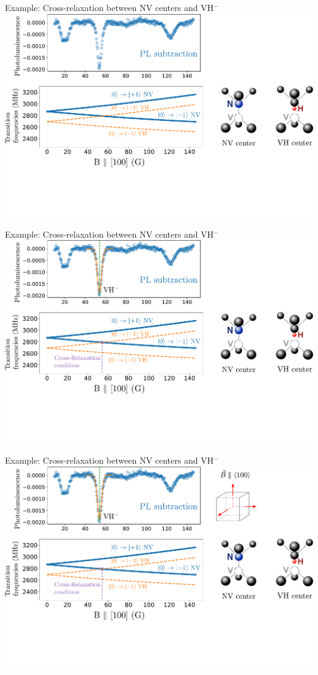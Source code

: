 \documentclass{beamer}
\begin{document}
\begin{frame}{Example: Cross-relaxation between NV centers and VH$^-$}
\centering
\includegraphics[width=\textwidth,height=0.85\textheight,keepaspectratio]{Slide_CR_VH_0}
\end{frame}

\begin{frame}{Example: Cross-relaxation between NV centers and VH$^-$}
\centering
\includegraphics[width=\textwidth,height=0.85\textheight,keepaspectratio]{Slide_CR_VH_1}
\end{frame}

\begin{frame}{Example: Cross-relaxation between NV centers and VH$^-$}
\centering
\includegraphics[width=\textwidth,height=0.85\textheight,keepaspectratio]{Slide_CR_VH_2}
\end{frame}
\end{document}
